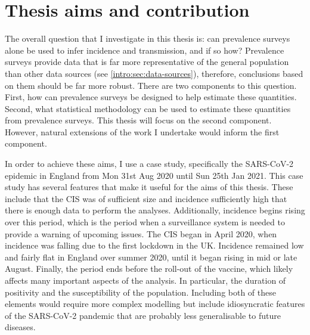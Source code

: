 \documentclass[thesis.tex]{subfiles}
\begin{document}


\section{Thesis aims and contribution} \label{intro:sec:aims}

The overall question that I investigate in this thesis is: can prevalence surveys alone be used to infer incidence and transmission, and if so how?
Prevalence surveys provide data that is far more representative of the general population than other data sources (see \cref{intro:sec:data-sources}), therefore, conclusions based on them should be far more robust.
There are two components to this question.
First, how can prevalence surveys be designed to help estimate these quantities.
Second, what statistical methodology can be used to estimate these quantities from prevalence surveys.
This thesis will focus on the second component.
However, natural extensions of the work I undertake would inform the first component.

In order to achieve these aims, I use a case study, specifically the SARS-CoV-2 epidemic in England from Mon 31st Aug 2020 until Sun 25th Jan 2021.
This case study has several features that make it useful for the aims of this thesis.
These include that the CIS was of sufficient size and incidence sufficiently high that there is enough data to perform the analyses.
Additionally, incidence begins rising over this period, which is the period when a surveillance system is needed to provide a warning of upcoming issues.
The CIS began in April 2020, when incidence was falling due to the first lockdown in the UK.
Incidence remained low and fairly flat in England over summer 2020, until it began rising in mid or late August.
Finally, the period ends before the roll-out of the vaccine, which likely affects many important aspects of the analysis.
In particular, the duration of positivity and the susceptibility of the population.
Including both of these elements would require more complex modelling but include idiosyncratic features of the SARS-CoV-2 pandemic that are probably less generalisable to future diseases.
\end{document}
